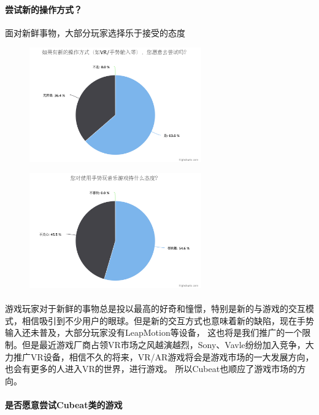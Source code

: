 \documentclass{article}
\begin{document}
\paragraph{尝试新的操作方式？}
面对新鲜事物，大部分玩家选择乐于接受的态度
\begin{figure}[H]
  \begin{minipage}{0.5\linewidth}
  \includegraphics[width=20em]{chart3.png}\\
  \caption{}\label{2-3}
\end{minipage}
\begin{minipage}{0.5\linewidth}
  \includegraphics[width=20em]{chart4.png}\\
  \caption{}\label{2-4}
\end{minipage}
\end{figure}
\paragraph{}
游戏玩家对于新鲜的事物总是投以最高的好奇和憧憬，特别是新的与游戏的交互模式，相信吸引到不少用户的眼球。但是新的交互方式也意味着新的缺陷，现在手势输入还未普及，大部分玩家没有LeapMotion等设备，
这也将是我们推广的一个限制。但是最近游戏厂商占领VR市场之风越演越烈，Sony、Vavle纷纷加入竞争，大力推广VR设备，相信不久的将来，VR/AR游戏将会是游戏市场的一大发展方向，也会有更多的人进入VR的世界，进行游戏。
所以Cubeat也顺应了游戏市场的方向。
\paragraph{是否愿意尝试Cubeat类的游戏}
\end{document}
